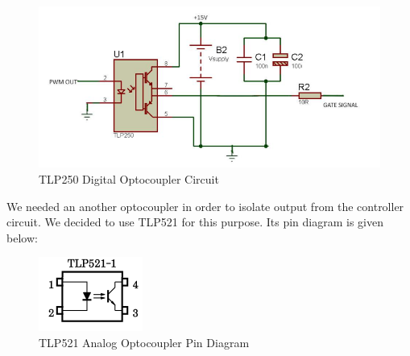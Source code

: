 \documentclass{article}
\newcommand\tab[1][1cm]{\hspace*{#1}}
\begin{document}
\begin{figure}[H]
    \centering
    \includegraphics[scale=0.5]{opto.PNG}
    \caption{TLP250 Digital Optocoupler Circuit}
    \label{fig:my_label}
\end{figure}
\tab We needed an another optocoupler in order to isolate output from the controller circuit. We decided to use TLP521 for this purpose. Its pin diagram is given below:
\begin{figure}[H]
    \centering
    \includegraphics[scale=1]{tlp521.PNG}
    \caption{TLP521 Analog Optocoupler Pin Diagram}
    \label{fig:my_label}
\end{figure}


\newpage
\end{document}
